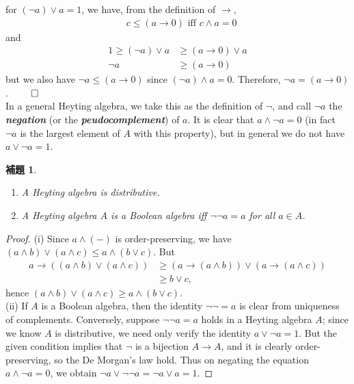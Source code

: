 \documentclass[a4j,12pt]{jarticle}
\numberwithin{equation}{section}
\newcommand{\itbf}[1]{\textit{\textbf{#1}}}
\newtheorem{lemma}[thm]{補題}
\begin{document}
for $(\neg a) \vee a = 1$, we have, from the definition of $\rightarrow$,
\begin{align*}
  &c \le (a \rightarrow 0) \text{ iff } c \wedge a = 0
\end{align*}
and
\begin{align*}
  1 \ge (\neg a) \vee a &\ge (a \rightarrow 0) \vee a \\
  \neg a &\ge (a \rightarrow 0)
\end{align*}
but we also have $\neg a \le (a \rightarrow 0)$ since $(\neg a) \wedge a = 0$. Therefore, $\neg a = (a \rightarrow 0)$. $\qed$\\
In a general Heyting algebra, we take this as the definition of $\neg$, and call $\neg a$ the \itbf{negation} (or the \itbf{peudocomplement}) of $a$.
It is clear that $a \wedge \neg a = 0$ (in fact $\neg a$ is the largest element of $A$ with this property), but in general we do not have $a \vee \neg a = 1$.
\begin{lemma}
  \begin{enumerate}
  \item A Heyting algebra is distributive.
  \item A Heyting algebra $A$ is a Boolean algebra iff $\neg \neg a = a$ for all $a \in A$.
  \end{enumerate}
\end{lemma}
\begin{proof}
  (i) Since $a \wedge (-)$ is order-preserving, we have $(a \wedge b) \vee  (a \wedge c) \le a \wedge (b \vee c)$. But
  \begin{align*}
    a \rightarrow ((a \wedge b) \vee (a \wedge c)) & \ge  (a \rightarrow (a \wedge b)) \vee (a \rightarrow (a \wedge c)) \\
                                                   & \ge  b \vee c,
  \end{align*}
  hence $(a \wedge b) \vee  (a \wedge c) \ge a \wedge (b \vee c)$. \\
  (ii) If $A$ is a Boolean algebra, then the identity $\neg \neg = a$ is clear from uniqueness of complements.
  Conversely, suppose $\neg \neg a = a$ holds in a Heyting algebra $A$; since we know $A$ is distributive, we need only verify the identity $a \vee \neg a = 1$.
  But the given condition implies that $\neg$ is a bijection $A \rightarrow A$, and it is clearly order-preserving, so the De Morgan's law hold.
  Thus on negating the equation $a \wedge \neg a =0$, we obtain $\neg a \vee \neg \neg a = \neg a \vee a = 1$.
\end{proof}
\end{document}
